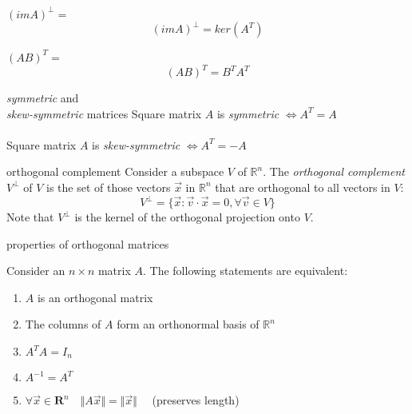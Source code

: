 \documentclass[avery5371,grid,letterpaper]{flashcards}
\newcommand{\Rn}{\mathbb{R}^{n}}
\begin{document}
\begin{flashcard}[Theorem]{$(imA)^{\bot} = $}
\begin{displaymath}
(imA)^{\bot} = ker(A^{T})
\end{displaymath}
\end{flashcard}

\begin{flashcard}[Theorem]{$(AB)^{T} = $}
\begin{displaymath}
(AB)^{T} = B^{T}A^{T}
\end{displaymath}
\end{flashcard}

\begin{flashcard}[Definition]{\textit{symmetric} and \\
\textit{skew-symmetric} matrices}
Square matrix $A$ is \textit{symmetric} $\Leftrightarrow A^{T} = A$
\\
\\
Square matrix $A$ is \textit{skew-symmetric} $\Leftrightarrow A^{T} = -A$
\end{flashcard}

\begin{flashcard}[Definition]{orthogonal complement}
Consider a subspace $V$ of $\Rn$.  The \textit{orthogonal complement}
$V^{\bot}$ of $V$ is the set of those vectors $\vec{x}$ in $\Rn$ that
are orthogonal to all vectors in $V$:
\begin{displaymath}
V^{\bot} = \lbrace \vec{x}: \vec{v}\cdot\vec{x} = 0, \forall \vec{v} \in V \rbrace
\end{displaymath}
Note that $V^{\bot}$ is the kernel of the orthogonal projection onto $V$.
\end{flashcard}

\begin{flashcard}[Theorem]{properties of orthogonal matrices}
\begin{small}
Consider an $n \times n$ matrix $A$.  The following statements are equivalent:
\begin{enumerate}
\item $A$ is an orthogonal matrix
\item The columns of $A$ form an orthonormal basis of $\Rn$
\item $A^{T}A = I_{n}$
\item $A^{-1} = A^{T}$
\item $\forall \vec{x} \in \mathbf{R}^{n} \quad \Vert A\vec{x} \Vert = \Vert \vec{x} \Vert \quad$ (preserves length)
\end{enumerate}
\end{small}
\end{flashcard}
\end{document}

